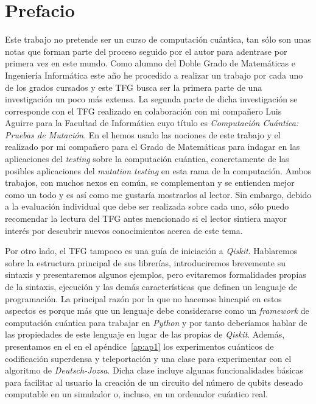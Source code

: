 \chapter*{Prefacio}

Este trabajo no pretende ser un curso de computación cuántica, tan sólo son unas notas que forman parte del proceso seguido por el autor para adentrase por primera vez en este mundo. Como alumno del Doble Grado de Matemáticas e Ingeniería Informática este año he procedido a realizar un trabajo por cada uno de los grados cursados y este TFG busca ser la primera parte de una investigación un poco más extensa. La segunda parte de dicha investigación se corresponde con el TFG realizado en colaboración con mi compañero Luis Aguirre para la Facultad de Informática cuyo título es \textit{Computación Cuántica: Pruebas de Mutación}. En el hemos usado las nociones de este trabajo y el realizado por mi compañero para el Grado de Matemáticas para indagar en las aplicaciones del \textit{testing} sobre la computación cuántica, concretamente de las posibles aplicaciones del \textit{mutation testing} en esta rama de la computación. Ambos trabajos, con muchos nexos en común, se complementan y se entienden mejor como un todo y es así como me gustaría mostrarlos al lector. Sin embargo, debido a la evaluación individual que debe ser realizada sobre cada uno, sólo puedo recomendar la lectura del TFG antes mencionado si el lector sintiera mayor interés por descubrir nuevos conocimientos acerca de este tema.

Por otro lado, el TFG tampoco es una guía de iniciación a \textit{Qiskit}. Hablaremos sobre la estructura principal de sus librerías, introduciremos brevemente su sintaxis  y presentaremos algunos ejemplos, pero evitaremos formalidades propias de la sintaxis, ejecución y las demás características que definen un lenguaje de programación. La principal razón por la que no hacemos hincapié en estos aspectos es porque más que un lenguaje debe considerarse como un \textit{framework} de computación cuántica para trabajar en \textit{Python} y por tanto deberíamos hablar de las propiedades de este lenguaje en lugar de las propias de \textit{Qiskit}. Además, presentamos en el en el apéndice~\ref{ap:ap1} los experimentos cuánticos de codificación superdensa y teleportación y una clase  para experimentar con el algoritmo de \textit{Deutsch-Jozsa}. Dicha clase incluye algunas funcionalidades básicas para facilitar al usuario la creación de un circuito del número de qubits deseado computable en un simulador o, incluso, en un ordenador cuántico real.

